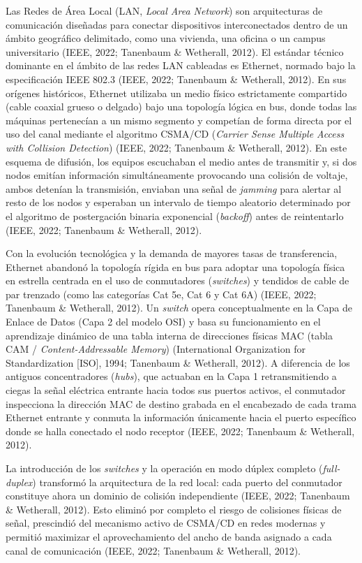 Las Redes de Área Local (LAN, \emph{Local Area Network}) son
arquitecturas de comunicación diseñadas para conectar dispositivos
interconectados dentro de un ámbito geográfico delimitado, como una
vivienda, una oficina o un campus universitario (IEEE, 2022; Tanenbaum
\& Wetherall, 2012). El estándar técnico dominante en el ámbito de las
redes LAN cableadas es Ethernet, normado bajo la especificación IEEE
802.3 (IEEE, 2022; Tanenbaum \& Wetherall, 2012). En sus orígenes
históricos, Ethernet utilizaba un medio físico estrictamente compartido
(cable coaxial grueso o delgado) bajo una topología lógica en bus, donde
todas las máquinas pertenecían a un mismo segmento y competían de forma
directa por el uso del canal mediante el algoritmo CSMA/CD
(\emph{Carrier Sense Multiple Access with Collision Detection}) (IEEE,
2022; Tanenbaum \& Wetherall, 2012). En este esquema de difusión, los
equipos escuchaban el medio antes de transmitir y, si dos nodos emitían
información simultáneamente provocando una colisión de voltaje, ambos
detenían la transmisión, enviaban una señal de \emph{jamming} para
alertar al resto de los nodos y esperaban un intervalo de tiempo
aleatorio determinado por el algoritmo de postergación binaria
exponencial (\emph{backoff}) antes de reintentarlo (IEEE, 2022;
Tanenbaum \& Wetherall, 2012).

Con la evolución tecnológica y la demanda de mayores tasas de
transferencia, Ethernet abandonó la topología rígida en bus para adoptar
una topología física en estrella centrada en el uso de conmutadores
(\emph{switches}) y tendidos de cable de par trenzado (como las
categorías Cat 5e, Cat 6 y Cat 6A) (IEEE, 2022; Tanenbaum \& Wetherall,
2012). Un \emph{switch} opera conceptualmente en la Capa de Enlace de
Datos (Capa 2 del modelo OSI) y basa su funcionamiento en el aprendizaje
dinámico de una tabla interna de direcciones físicas MAC (tabla CAM /
\emph{Content-Addressable Memory}) (International Organization for
Standardization {[}ISO{]}, 1994; Tanenbaum \& Wetherall, 2012). A
diferencia de los antiguos concentradores (\emph{hubs}), que actuaban en
la Capa 1 retransmitiendo a ciegas la señal eléctrica entrante hacia
todos sus puertos activos, el conmutador inspecciona la dirección MAC de
destino grabada en el encabezado de cada trama Ethernet entrante y
conmuta la información únicamente hacia el puerto específico donde se
halla conectado el nodo receptor (IEEE, 2022; Tanenbaum \& Wetherall,
2012).

La introducción de los \emph{switches} y la operación en modo dúplex
completo (\emph{full-duplex}) transformó la arquitectura de la red
local: cada puerto del conmutador constituye ahora un dominio de
colisión independiente (IEEE, 2022; Tanenbaum \& Wetherall, 2012). Esto
eliminó por completo el riesgo de colisiones físicas de señal,
prescindió del mecanismo activo de CSMA/CD en redes modernas y permitió
maximizar el aprovechamiento del ancho de banda asignado a cada canal de
comunicación (IEEE, 2022; Tanenbaum \& Wetherall, 2012).

